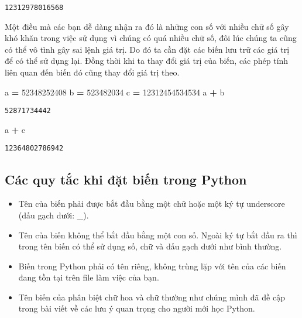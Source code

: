 \documentclass[
]{book}
\newenvironment{Shaded}{\begin{snugshade}}{\end{snugshade}}
\newcommand{\DecValTok}[1]{\textcolor[rgb]{0.00,0.00,0.81}{#1}}
\newcommand{\NormalTok}[1]{#1}
\newcommand{\OperatorTok}[1]{\textcolor[rgb]{0.81,0.36,0.00}{\textbf{#1}}}
\providecommand{\tightlist}{%
  \setlength{\itemsep}{0pt}\setlength{\parskip}{0pt}}
\begin{document}
\begin{verbatim}
12312978016568
\end{verbatim}

Một điều mà các bạn dễ dàng nhận ra đó là những con số với nhiều chữ số gây khó khăn trong việc sử dụng vì chúng có quá nhiều chữ số, đôi lúc chúng ta cũng có thể vô tình gây sai lệnh giá trị. Do đó ta cần đặt các biến lưu trữ các giá trị để có thể sử dụng lại. Đồng thời khi ta thay đổi giá trị của biến, các phép tính liên quan đến biến đó cũng thay đổi giá trị theo.

\begin{Shaded}
\begin{Highlighting}[]
\NormalTok{a }\OperatorTok{=} \DecValTok{52348252408}
\NormalTok{b }\OperatorTok{=} \DecValTok{523482034}
\NormalTok{c }\OperatorTok{=} \DecValTok{12312454534534}
\NormalTok{a }\OperatorTok{+}\NormalTok{ b}
\end{Highlighting}
\end{Shaded}

\begin{verbatim}
52871734442
\end{verbatim}

\begin{Shaded}
\begin{Highlighting}[]
\NormalTok{a }\OperatorTok{+}\NormalTok{ c}
\end{Highlighting}
\end{Shaded}

\begin{verbatim}
12364802786942
\end{verbatim}

\subsection{Các quy tắc khi đặt biến trong Python}\label{cuxe1c-quy-tux1eafc-khi-ux111ux1eb7t-biux1ebfn-trong-python}

\begin{itemize}
\tightlist
\item
  Tên của biến phải được bắt đầu bằng một chữ hoặc một ký tự underscore (dấu gạch dưới: \_).
\item
  Tên của biến không thể bắt đầu bằng một con số. Ngoài ký tự bắt đầu ra thì trong tên biến có thể sử dụng số, chữ và dấu gạch dưới như bình thường.
\item
  Biến trong Python phải có tên riêng, không trùng lặp với tên của các biến đang tồn tại trên file làm việc của bạn.
\item
  Tên biến của phân biệt chữ hoa và chữ thường như chúng mình đã đề cập trong bài viết về các lưu ý quan trọng cho người mới học Python.
\end{itemize}
\end{document}
